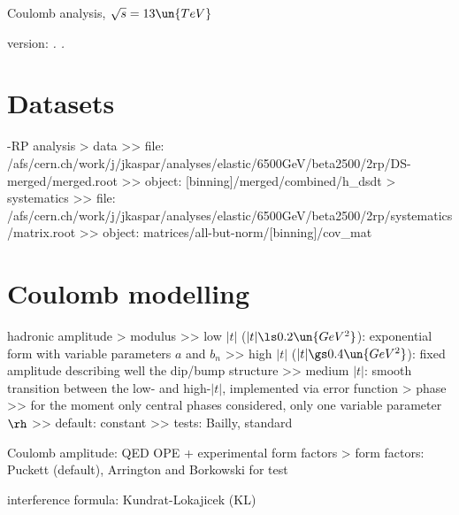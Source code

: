 

\def\baseDir{/afs/cern.ch/work/j/jkaspar/analyses/elastic/6500GeV/combined/coulomb_analysis_1}


\hbox{}
\vskip-10mm

\centerline{\SetFontSizesXX Coulomb analysis, $\sqrt s = 13\un{TeV}$}
\vskip2mm
\centerline{version: {\it \number\day. \number\month. \number\year}}

\vfil
\InsertToc

\vfil
\eject

\BeginText

\chapter[datasets]{Datasets}

-RP analysis
\>> data
\>>> file: /afs/cern.ch/work/j/jkaspar/analyses/elastic/6500GeV/beta2500/2rp/DS-merged/merged.root
\>>> object: [binning]/merged/combined/h\_dsdt
\>> systematics
\>>> file: /afs/cern.ch/work/j/jkaspar/analyses/elastic/6500GeV/beta2500/2rp/systematics/matrix.root
\>>> object: matrices/all-but-norm/[binning]/cov\_mat


\chapter[modelling]{Coulomb modelling}

\> hadronic amplitude
\>> modulus
\>>> low $|t|$ ($|t| \ls 0.2\un{GeV^2}$): exponential form with variable parameters $a$ and $b_n$
\>>> high $|t|$ ($|t| \gs 0.4\un{GeV^2}$): fixed amplitude describing well the dip/bump structure
\>>> medium $|t|$: smooth transition between the low- and high-$|t|$, implemented via error function
\>> phase
\>>> for the moment only central phases considered, only one variable parameter $\rh$
\>>> default: constant
\>>> tests: Bailly, standard

\> Coulomb amplitude: QED OPE + experimental form factors
\>> form factors: Puckett (default), Arrington and Borkowski for test

\> interference formula: Kundrat-Lokajicek (KL)

